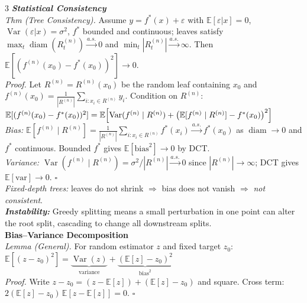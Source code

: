 \documentclass[a4paper,7pt]{article}
\begin{document}
\begin{multicols*}{3}
\textit{\textbf{Statistical Consistency}}\\
\textit{Thm (Tree Consistency).} Assume $y=f^*(x)+\varepsilon$ with $\mathbb{E}[\varepsilon|x]=0$, $\operatorname{Var}(\varepsilon|x)=\sigma^2$, $f^*$ bounded and continuous; leaves satisfy $\max_t\operatorname{diam}(R_t^{(n)})\xrightarrow{a.s.}0$ and $\min_t|R_t^{(n)}|\xrightarrow{a.s.}\infty$. Then $\mathbb{E}[(f^{(n)}(x_0)-f^*(x_0))^2]\to 0$.\\
\textit{Proof.} Let $R^{(n)}=R^{(n)}(x_0)$ be the random leaf containing $x_0$ and $f^{(n)}(x_0)=\frac{1}{|R^{(n)}|}\sum_{i:x_i\in R^{(n)}}y_i$. Condition on $R^{(n)}$:\\
$\mathbb{E}[(f^{(n)}(x_0)-f^*(x_0))^2]\\=\mathbb{E}\!\left[\operatorname{Var}(f^{(n)}\mid R^{(n)})+\bigl(\mathbb{E}[f^{(n)}\mid R^{(n)}]-f^*(x_0)\bigr)^2\right]$\\
\textit{Bias:} $\mathbb{E}[f^{(n)}\mid R^{(n)}]=\frac{1}{|R^{(n)}|}\sum_{i:x_i\in R^{(n)}}f^*(x_i)\xrightarrow{a.s.}f^*(x_0)$ as $\operatorname{diam}\to 0$ and $f^*$ continuous. Bounded $f^*$ gives $\mathbb{E}[\text{bias}^2]\to 0$ by DCT.\\
\textit{Variance:} $\operatorname{Var}(f^{(n)}\mid R^{(n)})=\sigma^2/|R^{(n)}|\xrightarrow{a.s.}0$ since $|R^{(n)}|\to\infty$; DCT gives $\mathbb{E}[\text{var}]\to 0$. \hfill$\square$\\
\textit{Fixed-depth trees:} leaves do not shrink $\Rightarrow$ bias does not vanish $\Rightarrow$ \emph{not consistent}.\\

\textit{\textbf{Instability:}} Greedy splitting means a small perturbation in one point can alter the root split, cascading to change all downstream splits.\\

\textbf{Bias--Variance Decomposition}\\
\textit{Lemma (General).} For random estimator $z$ and fixed target $z_0$:\\
$\mathbb{E}[(z-z_0)^2]=\underbrace{\operatorname{Var}(z)}_{\text{variance}}+\underbrace{(\mathbb{E}[z]-z_0)^2}_{\text{bias}^2}$\\
\textit{Proof.} Write $z-z_0=(z-\mathbb{E}[z])+(\mathbb{E}[z]-z_0)$ and square. Cross term: $2(\mathbb{E}[z]-z_0)\,\mathbb{E}[z-\mathbb{E}[z]]=0$. \hfill$\square$\\


\end{multicols*}
\end{document}

